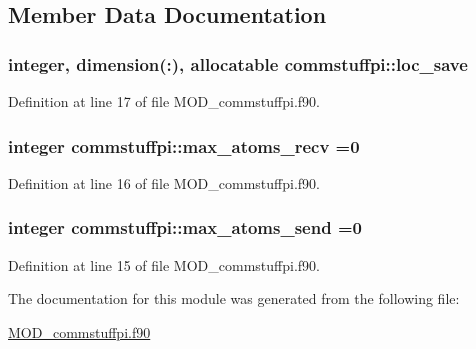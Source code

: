 \subsection{Member Data Documentation}
\hypertarget{classcommstuffpi_a01eab2a4a4cdaa4f1694d2334e5cef33}{
\subsubsection[{loc\-\_\-save}]{\setlength{\rightskip}{0pt plus 5cm}integer, dimension(\-:), allocatable commstuffpi\-::loc\-\_\-save}}\label{classcommstuffpi_a01eab2a4a4cdaa4f1694d2334e5cef33}


Definition at line 17 of file M\-O\-D\-\_\-commstuffpi.\-f90.

\hypertarget{classcommstuffpi_a16adc021090614145f2e1a5ebfea814c}{
\subsubsection[{max\-\_\-atoms\-\_\-recv}]{\setlength{\rightskip}{0pt plus 5cm}integer commstuffpi\-::max\-\_\-atoms\-\_\-recv =0}}\label{classcommstuffpi_a16adc021090614145f2e1a5ebfea814c}


Definition at line 16 of file M\-O\-D\-\_\-commstuffpi.\-f90.

\hypertarget{classcommstuffpi_a0bef763ac1a5d3157ae962df1a565ff3}{
\subsubsection[{max\-\_\-atoms\-\_\-send}]{\setlength{\rightskip}{0pt plus 5cm}integer commstuffpi\-::max\-\_\-atoms\-\_\-send =0}}\label{classcommstuffpi_a0bef763ac1a5d3157ae962df1a565ff3}


Definition at line 15 of file M\-O\-D\-\_\-commstuffpi.\-f90.



The documentation for this module was generated from the following file\-:\begin{DoxyCompactItemize}
\item 
\hyperlink{MOD__commstuffpi_8f90}{M\-O\-D\-\_\-commstuffpi.\-f90}\end{DoxyCompactItemize}
